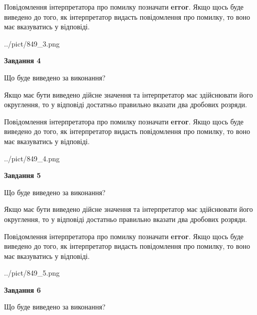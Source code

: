 \documentclass[12pt, ukrainian]{article}
\begin{document}
{\begin {Large}
Повідомлення інтерпретатора про помилку позначати \textbf{error}.
Якщо щось буде виведено до того, як інтерпретатор видасть повідомлення про помилку, 
то воно має вказуватись у відповіді. \par

\begin{center}
	{../pict/849_3.png}
\end{center}
\newpage

{\begin {center}\textbf{Завдання 4}\end {center}}\par
Що буде виведено за виконання? \par

Якщо має бути виведено дійсне значення та інтерпретатор має здійснювати його округлення, 
то у відповіді достатньо правильно вказати два дробових розряди.

Повідомлення інтерпретатора про помилку позначати \textbf{error}.
Якщо щось буде виведено до того, як інтерпретатор видасть повідомлення про помилку, 
то воно має вказуватись у відповіді. \par

\begin{center}
	{../pict/849_4.png}
\end{center}
\newpage

{\begin {center}\textbf{Завдання 5}\end {center}}\par
Що буде виведено за виконання? \par

Якщо має бути виведено дійсне значення та інтерпретатор має здійснювати його округлення, 
то у відповіді достатньо правильно вказати два дробових розряди.

Повідомлення інтерпретатора про помилку позначати \textbf{error}.
Якщо щось буде виведено до того, як інтерпретатор видасть повідомлення про помилку, 
то воно має вказуватись у відповіді. \par

\begin{center}
	{../pict/849_5.png}
\end{center}
\newpage

{\begin {center}\textbf{Завдання 6}\end {center}}\par
Що буде виведено за виконання? \par


\end{Large}}
\end{document}
